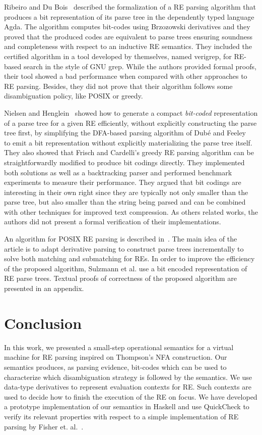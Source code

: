 \documentclass[sigplan]{acmart}
\theoremstyle{definition}
\begin{document}
Ribeiro and Du Bois~\cite{Ribeiro2017} described the formalization of a RE parsing algorithm that produces a bit representation
of its parse tree in the dependently typed language Agda. The algorithm computes bit-codes using Brzozowski derivatives and
they proved that the produced codes are equivalent to parse trees ensuring soundness and completeness with respect to an
inductive RE semantics. They included the certified algorithm in a tool developed by themselves, named verigrep, for RE-based
search in the style of GNU grep. While the authors provided formal proofs, their tool showed a bad performance when compared with
other approaches to RE parsing. Besides, they did not prove that their algorithm follows some disambiguation policy, like POSIX
or greedy.

Nielsen and Henglein~\cite{Lasse2011} showed how to generate a compact \textit{bit-coded} representation of a parse tree for a
given RE efficiently, without explicitly constructing the parse tree first, by simplifying the DFA-based parsing algorithm of
Dub\'e and Feeley~\cite{Dube2000} to emit a bit representation without explicitly materializing the parse tree itself.
They also showed that Frisch and Cardelli's greedy RE parsing algorithm \cite{Frisch2004} can be straightforwardly modified to
produce bit codings directly. They implemented both solutions as well as a backtracking parser and performed benchmark experiments
to measure their performance. They argued that bit codings are interesting in their own right since they are typically not
only smaller than the parse tree, but also smaller than the string being parsed and can be combined with other techniques for
improved text compression. As others related works, the authors did not present a formal verification of their implementations.

An algorithm for POSIX RE parsing is described in~\cite{Sulzmann14}. The main idea of the article is to adapt
derivative parsing to construct parse trees incrementally to solve both matching and submatching for REs. In order to improve the
efficiency of the proposed algorithm, Sulzmann et al. use a bit encoded representation of RE parse trees. Textual proofs of
correctness of the proposed algorithm are presented in an appendix.

\section{Conclusion}\label{section:conclusion}

In this work, we presented a small-step operational semantics for a virtual machine for RE parsing inspired on
Thompson's NFA construction. Our semantics produces, as parsing evidence, bit-codes which can be used to characterize which
disambiguation strategy is followed by the semantics. We use data-type derivatives to represent evaluation contexts for RE.
Such contexts are used to decide how to finish the execution of the RE on focus. We have developed a prototype implementation
of our semantics in Haskell and use QuickCheck to verify its relevant properties with respect to a simple implementation
of RE parsing by Fisher et. al.~\cite{Fischer2010}.
\end{document}
